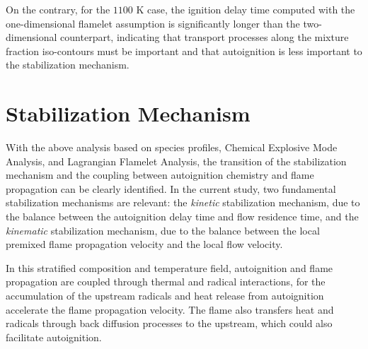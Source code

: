 \documentclass[review,3p,times]{elsarticle}
\begin{document}
On the contrary, for the $1100$ K case, the ignition delay time computed with the one-dimensional flamelet assumption is significantly longer than the two-dimensional counterpart, indicating that 
\textcolor{mycolor}{transport processes along the mixture fraction iso-contours must be important and that autoignition is less important to the stabilization mechanism.}


\section{Stabilization Mechanism} \label{sec:regime}
With the above analysis based on species profiles, Chemical Explosive Mode Analysis, and Lagrangian Flamelet Analysis, the transition of the stabilization mechanism and the coupling between autoignition chemistry and flame propagation can be clearly identified.  In the current study, two fundamental stabilization mechanisms are relevant: the \emph {kinetic} stabilization mechanism, due to the balance between the autoignition delay time and flow residence time, and the \emph {kinematic} stabilization mechanism, due to the balance between the \textcolor{mycolor}{local} premixed flame propagation velocity and the local flow velocity.  

In this stratified composition and temperature field, autoignition and flame propagation are coupled through thermal and radical interactions, for the accumulation of the upstream radicals and heat release from autoignition accelerate the flame propagation velocity.  The flame also transfers heat and radicals through back diffusion processes to the upstream, which could also facilitate autoignition.
\end{document}
